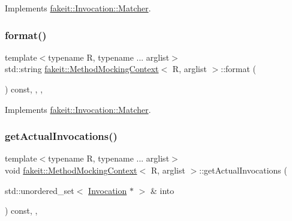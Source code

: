 Implements \mbox{\hyperlink{structfakeit_1_1Invocation_1_1Matcher_af570f2942a21d89cb3a09889bd9ac6f2}{fakeit\+::\+Invocation\+::\+Matcher}}.

\mbox{\label{classfakeit_1_1MethodMockingContext_a0e71b77ab7f91d629a5853542d48624a}} 
\subsubsection{\texorpdfstring{format()}{format()}\hspace{0.1cm}{\footnotesize\ttfamily [9/9]}}
{\footnotesize\ttfamily template$<$typename R, typename ... arglist$>$ \\
std\+::string \mbox{\hyperlink{classfakeit_1_1MethodMockingContext}{fakeit\+::\+Method\+Mocking\+Context}}$<$ R, arglist $>$\+::format (\begin{DoxyParamCaption}{ }\end{DoxyParamCaption}) const\hspace{0.3cm}{\ttfamily [inline]}, {\ttfamily [override]}, {\ttfamily [protected]}, {\ttfamily [virtual]}}



Implements \mbox{\hyperlink{structfakeit_1_1Invocation_1_1Matcher_af570f2942a21d89cb3a09889bd9ac6f2}{fakeit\+::\+Invocation\+::\+Matcher}}.

\mbox{\label{classfakeit_1_1MethodMockingContext_ad6803405abfd419799882f837d6f56b6}} 
\subsubsection{\texorpdfstring{getActualInvocations()}{getActualInvocations()}\hspace{0.1cm}{\footnotesize\ttfamily [1/9]}}
{\footnotesize\ttfamily template$<$typename R, typename ... arglist$>$ \\
void \mbox{\hyperlink{classfakeit_1_1MethodMockingContext}{fakeit\+::\+Method\+Mocking\+Context}}$<$ R, arglist $>$\+::get\+Actual\+Invocations (\begin{DoxyParamCaption}\item[{std\+::unordered\+\_\+set$<$ \mbox{\hyperlink{structfakeit_1_1Invocation}{Invocation}} $\ast$ $>$ \&}]{into }\end{DoxyParamCaption}) const\hspace{0.3cm}{\ttfamily [inline]}, {\ttfamily [override]}, {\ttfamily [protected]}}



